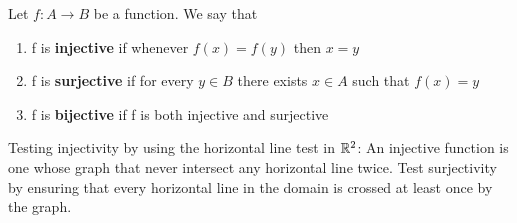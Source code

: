 \documentclass[11pt]{article}
\begin{document}
\begin{defn}
  \label{jectivity}
  Let $f: A \to B$ be a function. We say that
  \begin{enumerate}
    \item f is \textbf{injective} if whenever $f(x) = f(y)$ then $x=y$
    \item f is \textbf{surjective} if for every $y\in B$ there exists $x\in A$ such that $f(x) = y$
    \item f is \textbf{bijective} if f is both injective and surjective
  \end{enumerate}

  \begin{rem}
    Testing injectivity by using the horizontal line test in $\mathbb{R}^2$: An injective function is one whose graph that never intersect any horizontal line twice. Test surjectivity by ensuring that every horizontal line in the domain is crossed at least once by the graph.
  \end{rem}
\end{defn}

\newpage
\end{document}
